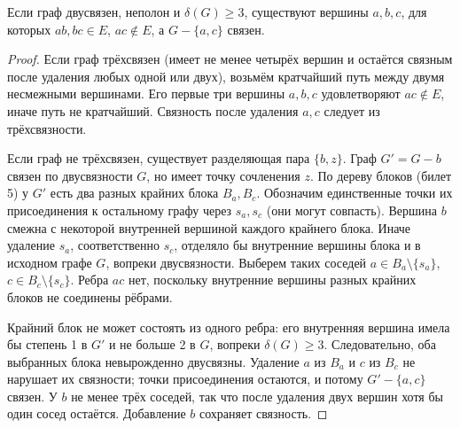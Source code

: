 \begin{lemma}\label{lem:lovasz}
Если граф двусвязен, неполон и \(\delta(G)\ge3\), существуют вершины
\(a,b,c\), для которых \(ab,bc\in E\), \(ac\notin E\),
а \(G-\{a,c\}\) связен.
\end{lemma}
\begin{proof}
Если граф трёхсвязен (имеет не менее четырёх вершин и остаётся связным
после удаления любых одной или двух), возьмём кратчайший путь между
двумя несмежными вершинами. Его первые три вершины \(a,b,c\)
удовлетворяют \(ac\notin E\), иначе путь не кратчайший.
Связность после удаления \(a,c\) следует из трёхсвязности.

Если граф не трёхсвязен, существует разделяющая пара \(\{b,z\}\).
Граф \(G'=G-b\) связен по двусвязности \(G\), но имеет точку сочленения \(z\).
По дереву блоков (билет 5) у \(G'\) есть два разных крайних блока
\(B_a,B_c\). Обозначим единственные точки их присоединения к остальному
графу через \(s_a,s_c\) (они могут совпасть).
Вершина \(b\) смежна с некоторой внутренней вершиной каждого крайнего
блока. Иначе удаление \(s_a\), соответственно \(s_c\), отделяло бы
внутренние вершины блока и в исходном графе \(G\), вопреки двусвязности.
Выберем таких соседей \(a\in B_a\setminus\{s_a\}\),
\(c\in B_c\setminus\{s_c\}\).
Ребра \(ac\) нет, поскольку внутренние вершины разных крайних блоков
не соединены рёбрами.

Крайний блок не может состоять из одного ребра: его внутренняя вершина
имела бы степень 1 в \(G'\) и не больше 2 в \(G\), вопреки \(\delta(G)\ge3\).
Следовательно, оба выбранных блока невырожденно двусвязны.
Удаление \(a\) из \(B_a\) и \(c\) из \(B_c\) не нарушает их связности;
точки присоединения остаются, и потому \(G'-\{a,c\}\) связен.
У \(b\) не менее трёх соседей, так что после удаления двух вершин
хотя бы один сосед остаётся. Добавление \(b\) сохраняет связность.
\end{proof}


